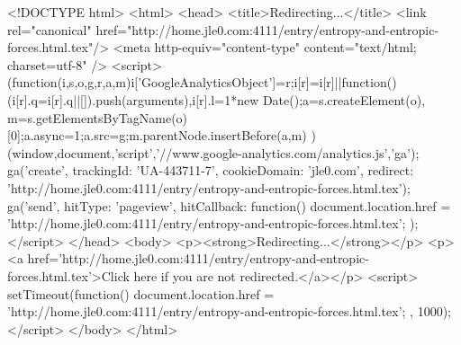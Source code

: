 <!DOCTYPE html>
<html>
<head>
<title>Redirecting...</title>
<link rel="canonical" href="http://home.jle0.com:4111/entry/entropy-and-entropic-forces.html.tex"/>
<meta http-equiv="content-type" content="text/html; charset=utf-8" />
<script>
(function(i,s,o,g,r,a,m){i['GoogleAnalyticsObject']=r;i[r]=i[r]||function(){
(i[r].q=i[r].q||[]).push(arguments)},i[r].l=1*new Date();a=s.createElement(o),
m=s.getElementsByTagName(o)[0];a.async=1;a.src=g;m.parentNode.insertBefore(a,m)
})(window,document,'script','//www.google-analytics.com/analytics.js','ga');
ga('create', { trackingId: 'UA-443711-7', cookieDomain: 'jle0.com', redirect: 'http://home.jle0.com:4111/entry/entropy-and-entropic-forces.html.tex'});
ga('send', { hitType: 'pageview', hitCallback: function() { document.location.href = 'http://home.jle0.com:4111/entry/entropy-and-entropic-forces.html.tex'; } });
</script>
</head>
<body>
  <p><strong>Redirecting...</strong></p>
  <p><a href='http://home.jle0.com:4111/entry/entropy-and-entropic-forces.html.tex'>Click here if you are not redirected.</a></p>
  <script>
    setTimeout(function() { document.location.href = 'http://home.jle0.com:4111/entry/entropy-and-entropic-forces.html.tex'; }, 1000);
  </script>
</body>
</html>
